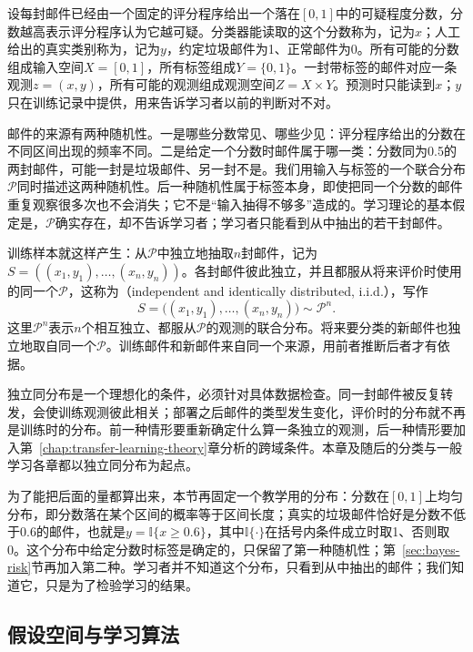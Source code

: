 设每封邮件已经由一个固定的评分程序给出一个落在$[0,1]$中的可疑程度分数，分数越高表示评分程序认为它越可疑。分类器能读取的这个分数称为，记为$x$；人工给出的真实类别称为，记为$y$，约定垃圾邮件为1、正常邮件为0。所有可能的分数组成输入空间$X=[0,1]$，所有标签组成$Y=\{0,1\}$。一封带标签的邮件对应一条观测$z=(x,y)$，所有可能的观测组成观测空间$Z=X\times Y$。预测时只能读到$x$；$y$只在训练记录中提供，用来告诉学习者以前的判断对不对。

邮件的来源有两种随机性。一是哪些分数常见、哪些少见：评分程序给出的分数在不同区间出现的频率不同。二是给定一个分数时邮件属于哪一类：分数同为0.5的两封邮件，可能一封是垃圾邮件、另一封不是。我们用输入与标签的一个联合分布$\mathcal P$同时描述这两种随机性。后一种随机性属于标签本身，即使把同一个分数的邮件重复观察很多次也不会消失；它不是“输入抽得不够多”造成的。学习理论的基本假定是，$\mathcal P$确实存在，却不告诉学习者；学习者只能看到从中抽出的若干封邮件。

训练样本就这样产生：从$\mathcal P$中独立地抽取$n$封邮件，记为$S=((x_1,y_1),\ldots,(x_n,y_n))$。各封邮件彼此独立，并且都服从将来评价时使用的同一个$\mathcal P$，这称为（independent and identically distributed, i.i.d.），写作
\begin{equation}
 S=\bigl((x_1,y_1),\ldots,(x_n,y_n)\bigr)\sim\mathcal P^n.
 \label{eq:training-sample-distribution}
\end{equation}
这里$\mathcal P^n$表示$n$个相互独立、都服从$\mathcal P$的观测的联合分布。将来要分类的新邮件也独立地取自同一个$\mathcal P$。训练邮件和新邮件来自同一个来源，用前者推断后者才有依据。

独立同分布是一个理想化的条件，必须针对具体数据检查。同一封邮件被反复转发，会使训练观测彼此相关；部署之后邮件的类型发生变化，评价时的分布就不再是训练时的分布。前一种情形要重新确定什么算一条独立的观测，后一种情形要加入第~\ref{chap:transfer-learning-theory}章分析的跨域条件。本章及随后的分类与一般学习各章都以独立同分布为起点。

为了能把后面的量都算出来，本节再固定一个教学用的分布：分数在$[0,1]$上均匀分布，即分数落在某个区间的概率等于区间长度；真实的垃圾邮件恰好是分数不低于0.6的邮件，也就是$y=\mathbb I\{x\geq0.6\}$，其中$\mathbb I\{\cdot\}$在括号内条件成立时取1、否则取0。这个分布中给定分数时标签是确定的，只保留了第一种随机性；第~\ref{sec:bayes-risk}节再加入第二种。学习者并不知道这个分布，只看到从中抽出的邮件；我们知道它，只是为了检验学习的结果。

\subsection{假设空间与学习算法}
\label{sec:learning-problem-algorithm}

